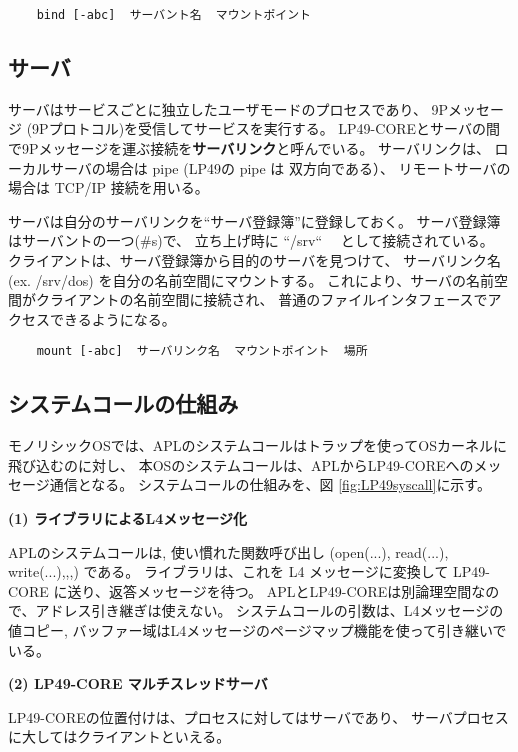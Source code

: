 \documentclass[draft]{ipsjpapers}
\begin{document}
  \verb|    bind [-abc]  サーバント名  マウントポイント|  \\



\subsection{サーバ}

  サーバはサービスごとに独立したユーザモードのプロセスであり、
  9Pメッセージ (9Pプロトコル)を受信してサービスを実行する。
  LP49-COREとサーバの間で9Pメッセージを運ぶ接続を{\bf サーバリンク}と呼んでいる。
  サーバリンクは、
  ローカルサーバの場合は pipe (LP49の pipe は 双方向である）、
  リモートサーバの場合は TCP/IP 接続を用いる。

  サーバは自分のサーバリンクを``サーバ登録簿''に登録しておく。
  サーバ登録簿はサーバントの一つ(\#s)で、 立ち上げ時に ``/srv``
　として接続されている。
  クライアントは、サーバ登録簿から目的のサーバを見つけて、
  サーバリンク名(ex. /srv/dos) を自分の名前空間にマウントする。
  これにより、サーバの名前空間がクライアントの名前空間に接続され、
  普通のファイルインタフェースでアクセスできるようになる。

  \verb|    mount [-abc]  サーバリンク名  マウントポイント  場所 |  \\


\subsection{システムコールの仕組み}

  モノリシックOSでは、APLのシステムコールはトラップを使ってOSカーネルに飛び込むのに対し、
本OSのシステムコールは、APLからLP49-COREへのメッセージ通信となる。
  システムコールの仕組みを、図 \ref{fig:LP49syscall}に示す。

{\bf (1) ライブラリによるL4メッセージ化}

   APLのシステムコールは, 使い慣れた関数呼び出し (open(...), read(...), write(...),,,) 
  である。
  ライブラリは、これを L4 メッセージに変換して LP49-CORE に送り、返答メッセージを待つ。
  APLとLP49-COREは別論理空間なので、アドレス引き継ぎは使えない。
  システムコールの引数は、L4メッセージの値コピー, 
  バッファー域はL4メッセージのページマップ機能を使って引き継いでいる。


{\bf (2) LP49-CORE マルチスレッドサーバ}

    LP49-COREの位置付けは、プロセスに対してはサーバであり、
    サーバプロセスに大してはクライアントといえる。
\end{document}
